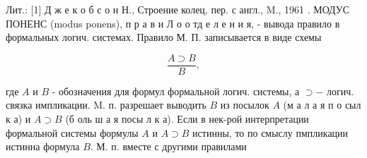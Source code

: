 \documentclass[10pt]{article}
\begin{document}
Лит.: [1] Д ж е к о б с о н Н., Строение колец, пер. с англ., M., 1961 . МОДУС ПОНЕНС (modus ponens), п р а в и Л о о тд е л е н и я, - вывода правило в формальных логич. системах. Правило М. П. записывается в виде схемы



\[

\frac{A \supset B}{B},

\]



где $A$ и $B$ - обозначения для формул формальной логич. системы, а $\supset-$ логич. связка импликации. M. п. разрешает выводить $B$ из посылок $A$ (м а л а я п о сыл к а) и $A \supset B$ (б оль ш а я посы л к а). Если в нек-рой интерпретации формальной системы формулы $A$ и $A \supset B$ истинны, то по смыслу пмпликации истинна формула $B$. М. п. вместе с другими правилами
\end{document}
